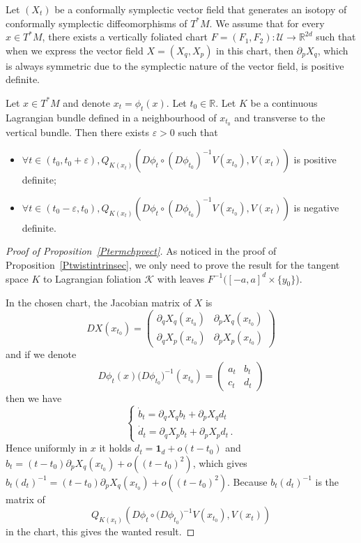 \documentclass[AHL, Unicode, longabstracts, published]{cedram}
\newcommand*\cU{\mathcal{U}}
\newcommand*\cal{\mathcal}
\newcommand{\bfone}{\mathbf{1}}
\newcommand*\R{\mathbb{R}}
\let\oldforall\forall
\renewcommand*{\forall}{\mathrel{\oldforall}}
\begin{document}
\begin{prop}\label{Ptermchpvect}
Let $(X_t)$ be a conformally symplectic vector field that generates an isotopy of conformally symplectic diffeomorphisms of $T^*M$. We assume that for every $x\in T^*M$, there exists a vertically foliated chart $F=(F_1, F_2):\cU\to \R^{2d}$ such that when we express the vector field $X=(X_q, X_p)$ in this chart, then $\partial_pX_q$, which is always symmetric due to the symplectic nature of the vector field, is positive definite.



Let $x\in T^*M$ and denote $x_t=\phi_t(x)$. Let $t_0\in\R$. Let $K$ be a continuous Lagrangian bundle defined in a neighbourhood of $x_{t_0}$ and transverse to the vertical bundle. Then there exists $\varepsilon>0$ such that
\begin{itemize}
\item $\forall t\in (t_0, t_0+\varepsilon), Q_{K(x_t)}(D\phi_t\circ (D\phi_{t_0})^{-1}V(x_{t_0}), V(x_t))$ is positive definite;
\item $\forall t\in (t_0-\varepsilon, t_0), Q_{K(x_t)}(D\phi_t\circ (D\phi_{t_0})^{-1}V(x_{t_0}), V(x_t))$ is negative definite.
\end{itemize}
\end{prop}

\begin{proof}[Proof of Proposition~\ref{Ptermchpvect}]
As noticed in the proof of Proposition~\ref{Ptwistintrinsec}, we only need to prove the result for the tangent space $K$ to Lagrangian foliation ${\cal K}$ with leaves $F^{-1}([-a, a]^d\times \{y_0\}$).

In the chosen chart, the Jacobian matrix of $X$ is
\[
DX(x_{t_0})=
\begin{pmatrix}\partial_qX_q(x_{t_0})&\partial_pX_q(x_{t_0})\\
\partial_qX_p(x_{t_0})&\partial_pX_p(x_{t_0})
\end{pmatrix}
\]
and if we denote
\[
D\phi_t(x) \big(D\phi_{t_0}\big)^{-1}(x_{t_0})=
\begin{pmatrix}a_t&b_t\\ c_t&d_t
\end{pmatrix}
\]
then we have
\begin{equation}\label{Ehamlin}
\begin{cases}
\dot b_t=\partial_qX_qb_t+\partial_pX_qd_t\\
\dot d_t=\partial_qX_pb_t+\partial_pX_pd_t\,.
\end{cases}
\end{equation}
Hence uniformly in $x$ it holds $d_t= \bfone_d+o(t-t_0)$ and $b_t=(t-t_0)\partial_pX_q(x_{t_0})+o((t-t_0)^2)$, which gives $b_t(d_t)^{-1}= (t-t_0)\partial_pX_q(x_{t_0})+o((t-t_0)^2)$. Because $b_t(d_t)^{-1}$ is the matrix of
\[
Q_{K(x_t)}\left(D\phi_t\circ \big(D\phi_{t_0}\big)^{-1}V(x_{t_0}), V(x_t)\right)
\]
in the chart, this gives the wanted result.
\end{proof}
\end{document}
